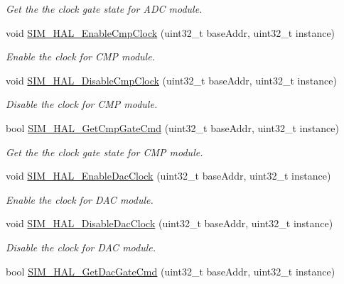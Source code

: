 \begin{DoxyCompactItemize}
\begin{DoxyCompactList}\small\item\em Get the the clock gate state for A\+DC module. \end{DoxyCompactList}\item 
void \hyperlink{group__sim__hal_gaa1276a5620cc2b078d7e975349ef7a57}{S\+I\+M\+\_\+\+H\+A\+L\+\_\+\+Enable\+Cmp\+Clock} (uint32\+\_\+t base\+Addr, uint32\+\_\+t instance)
\begin{DoxyCompactList}\small\item\em Enable the clock for C\+MP module. \end{DoxyCompactList}\item 
void \hyperlink{group__sim__hal_gaf92721b220bccdf5e5e296f11889a02a}{S\+I\+M\+\_\+\+H\+A\+L\+\_\+\+Disable\+Cmp\+Clock} (uint32\+\_\+t base\+Addr, uint32\+\_\+t instance)
\begin{DoxyCompactList}\small\item\em Disable the clock for C\+MP module. \end{DoxyCompactList}\item 
bool \hyperlink{group__sim__hal_ga7a6fe7f5ab2b59dd6461e03ddc6f2fc9}{S\+I\+M\+\_\+\+H\+A\+L\+\_\+\+Get\+Cmp\+Gate\+Cmd} (uint32\+\_\+t base\+Addr, uint32\+\_\+t instance)
\begin{DoxyCompactList}\small\item\em Get the the clock gate state for C\+MP module. \end{DoxyCompactList}\item 
void \hyperlink{group__sim__hal_gadaa3c179357b1ebb792a6c1df168696c}{S\+I\+M\+\_\+\+H\+A\+L\+\_\+\+Enable\+Dac\+Clock} (uint32\+\_\+t base\+Addr, uint32\+\_\+t instance)
\begin{DoxyCompactList}\small\item\em Enable the clock for D\+AC module. \end{DoxyCompactList}\item 
void \hyperlink{group__sim__hal_ga76aab819376744fdfa4bdc27b4c51ad9}{S\+I\+M\+\_\+\+H\+A\+L\+\_\+\+Disable\+Dac\+Clock} (uint32\+\_\+t base\+Addr, uint32\+\_\+t instance)
\begin{DoxyCompactList}\small\item\em Disable the clock for D\+AC module. \end{DoxyCompactList}\item 
bool \hyperlink{group__sim__hal_gafa3223f570468edaed2c7eda1979cabf}{S\+I\+M\+\_\+\+H\+A\+L\+\_\+\+Get\+Dac\+Gate\+Cmd} (uint32\+\_\+t base\+Addr, uint32\+\_\+t instance)

\end{DoxyCompactItemize}

